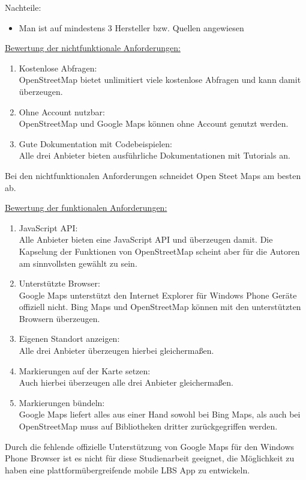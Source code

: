 Nachteile:
\begin{itemize}
\item Man ist auf mindestens 3 Hersteller bzw. Quellen angewiesen
\end{itemize}



\underline{Bewertung der nichtfunktionale Anforderungen:}
\begin{enumerate}
\item Kostenlose Abfragen: \\
OpenStreetMap bietet unlimitiert viele kostenlose Abfragen und kann damit überzeugen.
\item Ohne Account nutzbar: \\
OpenStreetMap und Google Maps können ohne Account genutzt werden.
\item Gute Dokumentation mit Codebeispielen:\\
Alle drei Anbieter bieten ausführliche Dokumentationen mit Tutorials an.
\end{enumerate}

Bei den nichtfunktionalen Anforderungen schneidet Open Steet Maps am besten ab. 

\underline{ Bewertung der funktionalen Anforderungen:}
\begin{enumerate}
\item JavaScript API:\\
Alle Anbieter bieten eine JavaScript API und überzeugen damit. Die Kapselung der Funktionen von OpenStreetMap scheint aber für die Autoren am sinnvollsten gewählt zu sein.
\item Unterstützte Browser:\\
Google Maps unterstützt den Internet Explorer für Windows Phone Geräte offiziell nicht. Bing Maps und OpenStreetMap können mit den unterstützten Browsern überzeugen.
\item Eigenen Standort anzeigen:\\
Alle drei Anbieter überzeugen hierbei gleichermaßen.
\item Markierungen auf der Karte setzen:\\
Auch hierbei überzeugen alle drei Anbieter gleichermaßen.
\item Markierungen bündeln:\\
Google Maps liefert alles aus einer Hand sowohl bei Bing Maps, als auch bei OpenStreetMap muss auf Bibliotheken dritter zurückgegriffen werden.
\end{enumerate}

Durch die fehlende offizielle Unterstützung von Google Maps für den Windows Phone Browser ist es nicht für diese Studienarbeit geeignet, die Möglichkeit zu haben eine plattformübergreifende mobile LBS App zu entwickeln.

